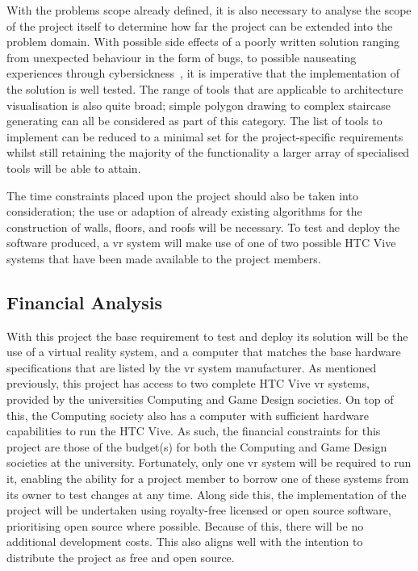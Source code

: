         With the problems scope already defined, it is also necessary to analyse the scope of the project itself to determine how far the project can be extended into the problem domain. With possible side effects of a poorly written solution ranging from unexpected behaviour in the form of bugs, to possible nauseating experiences through cybersickness~\cite{LaViola:2000:DCV:333329.333344}, it is imperative that the implementation of the solution is well tested. The range of tools that are applicable to architecture visualisation is also quite broad; simple polygon drawing to complex staircase generating can all be considered as part of this category. The list of tools to implement can be reduced to a minimal set for the project-specific requirements whilst still retaining the majority of the functionality a larger array of specialised tools will be able to attain. 
        
        The time constraints placed upon the project should also be taken into consideration; the use or adaption of already existing algorithms for the construction of walls, floors, and roofs will be necessary. To test and deploy the software produced, a \acrshort{vr} system will make use of one of two possible HTC Vive systems that have been made available to the project members.
    
    \subsection{Financial Analysis}
    
        With this project the base requirement to test and deploy its solution will be the use of a virtual reality system, and a computer that matches the base hardware specifications that are listed by the \acrshort{vr} system manufacturer. As mentioned previously, this project has access to two complete HTC Vive \acrshort{vr} systems, provided by the universities Computing and Game Design societies. On top of this, the Computing society also has a computer with sufficient hardware capabilities to run the HTC Vive. As such, the financial constraints for this project are those of the budget(s) for both the Computing and Game Design societies at the university. Fortunately, only one \acrshort{vr} system will be required to run it, enabling the ability for a project member to borrow one of these systems from its owner to test changes at any time. Along side this, the implementation of the project will be undertaken using royalty-free licensed or open source software, prioritising open source where possible. Because of this, there will be no additional development costs. This also aligns well with the intention to distribute the project as free and open source.
    
